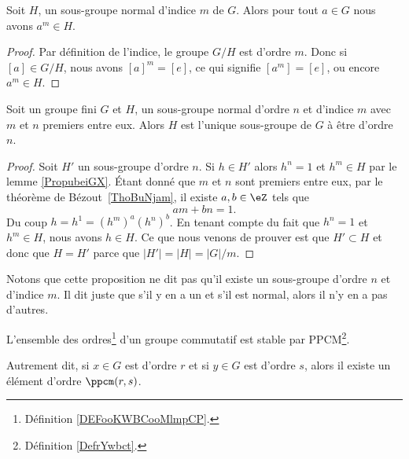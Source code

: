 \begin{lemma}\label{PropubeiGX}
    Soit \( H\), un sous-groupe normal d'indice \( m\) de \( G\). Alors pour tout \( a\in G\) nous avons \( a^m\in H\).
\end{lemma}

\begin{proof}
    Par définition de l'indice, le groupe \( G/H\) est d'ordre \( m\). Donc si \( [a]\in G/H\), nous avons \( [a]^m=[e]\), ce qui signifie \( [a^m]=[e]\), ou encore \( a^m\in H\).
\end{proof}

\begin{proposition}     \label{PROPooVWVIooQzuAlA}
    Soit un groupe fini \( G\) et \( H\), un sous-groupe normal d'ordre \( n\) et d'indice \( m\) avec \( m\) et \( n\) premiers entre eux. Alors \( H\) est l'unique sous-groupe de \( G\) à être d'ordre \( n\).
\end{proposition}

\begin{proof}
    Soit \( H'\) un sous-groupe d'ordre \( n\). Si \( h\in H'\) alors \( h^n=1\) et \( h^m\in H\) par le lemme \ref{PropubeiGX}. Étant donné que \( m\) et \( n\) sont premiers entre eux, par le théorème de Bézout~\ref{ThoBuNjam}, il existe \( a,b\in \eZ\) tels que
    \begin{equation}
        am+bn=1.
    \end{equation}
    Du coup \( h=h^1=(h^m)^a(h^n)^b\). En tenant compte du fait que \( h^n=1\) et \( h^m\in H\), nous avons \( h\in H\). Ce que nous venons de prouver est que \( H'\subset H\) et donc que \( H=H'\) parce que \( | H' |=| H |=| G |/m\).
\end{proof}

\begin{normaltext}
    Notons que cette proposition ne dit pas qu'il existe un sous-groupe d'ordre \( n\) et d'indice \( m\). Il dit juste que s'il y en a un et s'il est normal, alors il n'y en a pas d'autres.
\end{normaltext}

\begin{lemma}       \label{LemqAUBYn}
    L'ensemble des ordres\footnote{Définition \ref{DEFooKWBCooMlmpCP}.} d'un groupe commutatif est stable par PPCM\footnote{Définition \ref{DefrYwbct}.}.

    Autrement dit, si \( x\in G\) est d'ordre \( r\) et si \( y\in G\) est d'ordre \( s\), alors il existe un élément d'ordre \( \ppcm(r,s)\).
\end{lemma}

